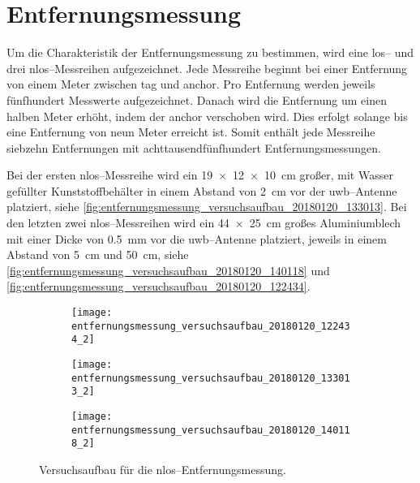 \section{Entfernungsmessung}

Um die Charakteristik der Entfernungsmessung zu bestimmen, wird eine \Gls{los}-- und drei \Gls{nlos}--Messreihen aufgezeichnet. Jede Messreihe beginnt bei einer Entfernung von einem Meter zwischen \Gls{tag} und \Gls{anchor}. Pro Entfernung werden jeweils fünfhundert Messwerte aufgezeichnet. Danach wird die Entfernung um einen halben Meter erhöht, indem der \Gls{anchor} verschoben wird. Dies erfolgt solange bis eine Entfernung von neun Meter erreicht ist. Somit enthält jede Messreihe siebzehn Entfernungen mit achttausendfünfhundert Entfernungsmessungen.

Bei der ersten \Gls{nlos}--Messreihe wird ein \SI{19x12x10}{\centi\meter} großer, mit Wasser gefüllter Kunststoffbehälter in einem Abstand von \SI{2}{\centi\meter} vor der \Gls{uwb}--Antenne platziert, siehe \autoref{fig:entfernungsmessung_versuchsaufbau_20180120_133013}. Bei den letzten zwei \Gls{nlos}--Messreihen wird ein \SI{44x25}{\centi\meter} großes Aluminiumblech mit einer Dicke von \SI{0.5}{\milli\meter} vor die \Gls{uwb}--Antenne platziert, jeweils in einem Abstand von \SI{5}{\centi\meter} und \SI{50}{\centi\meter}, siehe \autoref{fig:entfernungsmessung_versuchsaufbau_20180120_140118} und \autoref{fig:entfernungsmessung_versuchsaufbau_20180120_122434}.


\begin{figure}[ht]
	\begin{minipage}{0.49\linewidth}
		\begin{subfigure}{\linewidth}
			\texttt{[image: entfernungsmessung\_versuchsaufbau\_20180120\_122434\_2]}
			\caption{ }
			\label{fig:entfernungsmessung_versuchsaufbau_20180120_122434}
		\end{subfigure}
	\end{minipage}
	\hfill
	\begin{minipage}{0.49\linewidth}
			\begin{minipage}{\linewidth}
				\begin{subfigure}{\linewidth}
					\texttt{[image: entfernungsmessung\_versuchsaufbau\_20180120\_133013\_2]}
					\caption{ }
					\label{fig:entfernungsmessung_versuchsaufbau_20180120_133013}
				\end{subfigure}
			\end{minipage}
			\par
			\bigskip
			\begin{minipage}{\linewidth}
				\begin{subfigure}{\linewidth}
					\texttt{[image: entfernungsmessung\_versuchsaufbau\_20180120\_140118\_2]}
					\caption{ }
					\label{fig:entfernungsmessung_versuchsaufbau_20180120_140118}
				\end{subfigure}	
			\end{minipage}
	\end{minipage}
	\caption{Versuchsaufbau für die \Gls{nlos}--Entfernungsmessung.}
	\label{fig:entfernungsmessung_versuchsaufbau_20180120}
\end{figure}


